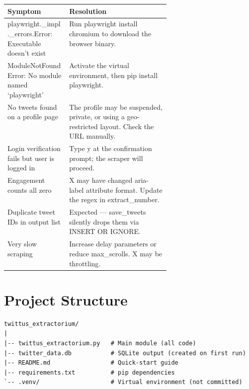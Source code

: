 \documentclass[11pt, a4paper]{article}
\def\method#1{#1}%
\def\texttt#1{#1}%
\def\color#1{}%
\newcommand{\method}[1]{\texttt{\color{TwBlue}#1}}
\begin{document}
\begin{center}
\begin{tabularx}{\linewidth}{>{\raggedright\arraybackslash}p{0.38\linewidth}X}
\toprule
\textbf{Symptom}                          & \textbf{Resolution} \\
\midrule
\texttt{playwright.\_impl.\_errors.Error: Executable doesn't exist} &
Run \texttt{playwright install chromium} to download the browser binary. \\
\addlinespace
\texttt{ModuleNotFoundError: No module named `playwright'} &
Activate the virtual environment, then \texttt{pip install playwright}. \\
\addlinespace
No tweets found on a profile page &
The profile may be suspended, private, or using a geo-restricted layout. Check the URL manually. \\
\addlinespace
Login verification fails but user is logged in &
Type \texttt{y} at the confirmation prompt; the scraper will proceed. \\
\addlinespace
Engagement counts all zero &
X may have changed \texttt{aria-label} attribute format. Update the regex in \method{extract\_number}. \\
\addlinespace
Duplicate tweet IDs in output list &
Expected --- \method{save\_tweets} silently drops them via \texttt{INSERT OR IGNORE}. \\
\addlinespace
Very slow scraping &
Increase delay parameters or reduce \texttt{max\_scrolls}. X may be throttling. \\
\bottomrule
\end{tabularx}
\end{center}

\section{Project Structure}

\begin{tcolorbox}[bashbox, title=Repository layout]
\begin{lstlisting}[style=bashcode]
twittus_extractorium/
|
|-- twittus_extractorium.py   # Main module (all code)
|-- twitter_data.db           # SQLite output (created on first run)
|-- README.md                 # Quick-start guide
|-- requirements.txt          # pip dependencies
`-- .venv/                    # Virtual environment (not committed)
\end{lstlisting}
\end{tcolorbox}
\end{document}
